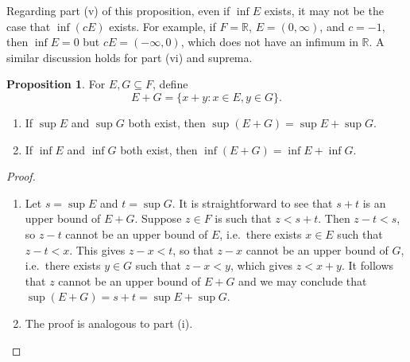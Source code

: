 \documentclass[12pt]{article}
\theoremstyle{definition}
\newtheorem{proposition}[definition]{Proposition}
\begin{document}
Regarding part (v) of this proposition, even if \( \inf E \) exists, it may not be the case that \( \inf (cE) \) exists. For example, if \( F = \mathbb{R} \), \( E = (0, \infty) \), and \( c = -1 \), then \( \inf E = 0 \) but \( cE = (-\infty, 0) \), which does not have an infimum in \( \mathbb{R} \). A similar discussion holds for part (vi) and suprema.

\begin{proposition}
\label{prop:add_sets}
    For \( E, G \subseteq F \), define
    \[
        E + G = \{ x + y : x \in E, y \in G \}. 
    \]
    \begin{enumerate}[label = (\roman*)]
        \item If \( \sup E \) and \( \sup G \) both exist, then \( \sup(E + G) = \sup E + \sup G \).

        \item If \( \inf E \) and \( \inf G \) both exist, then \( \inf(E + G) = \inf E + \inf G \).
    \end{enumerate}
\end{proposition}

\begin{proof}
    \begin{enumerate}[label = (\roman*)]
        \item Let \( s = \sup E \) and \( t = \sup G \). It is straightforward to see that \( s + t \) is an upper bound of \( E + G \). Suppose \( z \in F \) is such that \( z < s + t \). Then \( z - t < s \), so \( z - t \) cannot be an upper bound of \( E \), i.e.\ there exists \( x \in E \) such that \( z - t < x \). This gives \( z - x < t \), so that \( z - x \) cannot be an upper bound of \( G \), i.e.\ there exists \( y \in G \) such that \( z - x < y \), which gives \( z < x + y \). It follows that \( z \) cannot be an upper bound of \( E + G \) and we may conclude that \( \sup(E + G) = s + t = \sup E + \sup G \).

        \item The proof is analogous to part (i). \qedhere
    \end{enumerate}
\end{proof}
\end{document}
